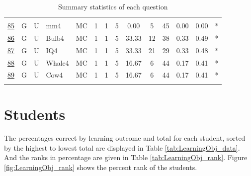 \documentclass[12pt,english,nohyper]{tufte-handout}\usepackage[]{graphicx}\usepackage[]{color}
\begin{document}
\begin{longtable}{cccl|cccc|ccccc|l}
   &  &  &  &  &  &  &  &  &  &  &  &  &  \\ 
  \hyperlink{T06.G.U.05.1.1.MC.mm4.2}{85} & G & U & mm4 & MC &   1 &   1 &   5 & 0.00 &   5 &  45 & 0.00 & 0.00 & * \\ 
  \hyperlink{T06.G.U.05.1.1.MC.Bulb4.2}{86} & G & U & Bulb4 & MC &   1 &   1 &   5 & 33.33 &  12 &  38 & 0.33 & 0.49 & * \\ 
  \hyperlink{T06.G.U.05.1.1.MC.IQ4.2}{87} & G & U & IQ4 & MC &   1 &   1 &   5 & 33.33 &  21 &  29 & 0.33 & 0.48 & * \\ 
  \hyperlink{T06.G.U.05.1.1.MC.Whale4.2}{88} & G & U & Whale4 & MC &   1 &   1 &   5 & 16.67 &   6 &  44 & 0.17 & 0.41 & * \\ 
  \hyperlink{T06.G.U.05.1.1.MC.Cow4.2}{89} & G & U & Cow4 & MC &   1 &   1 &   5 & 16.67 &   6 &  44 & 0.17 & 0.41 & * \\ 
   \hline
\hline
\caption{Summary statistics of each question} 
\label{tab:summary_question}
\end{longtable}


\clearpage
\newpage{}
\section{Students}
The percentages correct by learning outcome and total for each student, sorted by the highest to lowest total are displayed in Table \ref{tab:LearningObj_data}. And the ranks in percentage are given in Table \ref{tab:LearningObj_rank}. Figure \ref{fig:LearningObj_rank} shows the percent rank of the students.
\end{document}
